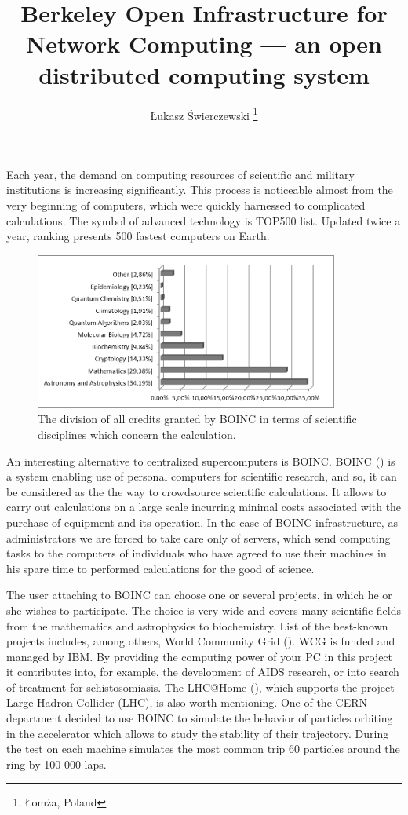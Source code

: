 \documentclass[10pt, a5paper]{article}
\begin{document}
\title{Berkeley Open Infrastructure for Network Computing — an open distributed computing system}
\author{Łukasz Świerczewski \footnote{Łomża, Poland}}
\maketitle
Each year, the demand on computing resources of scientific and military institutions is increasing significantly. This process is noticeable almost from the very beginning of computers, which were quickly harnessed to complicated calculations. The symbol of advanced technology is TOP500 list. Updated twice a year, ranking presents 500 fastest computers on Earth.

\begin{figure}[b!]
  \centering
  \includegraphics[width=10cm]{104_2013_w_Swierczewski_boinc_1}
  \caption{The division of all credits granted by BOINC in terms of scientific disciplines which concern the calculation.}\label{fig:swier1}
\end{figure}

An interesting alternative to centralized supercomputers is BOINC. BOINC (\cite{swier1}) is a system enabling use of personal computers for scientific research, and so, it can be considered as the the way to crowdsource scientific calculations. It allows to carry out calculations on a large scale incurring minimal costs associated with the purchase of equipment and its operation. In the case of BOINC infrastructure, as administrators we are forced to take care only of servers, which send computing tasks to the computers of individuals who have agreed to use their machines in his spare time to performed calculations for the good of science.

The user attaching to BOINC can choose one or several projects, in which he or she wishes to participate. The choice is very wide and covers many scientific fields from the mathematics and astrophysics to biochemistry. List of the best-known projects includes, among others, World Community Grid (\cite{swier2}). WCG is funded and managed by IBM. By providing the computing power of your PC in this project it contributes into, for example, the development of AIDS research, or into search of treatment for schistosomiasis. The LHC@Home (\cite{swier3}), which supports the project Large Hadron Collider (LHC), is also worth mentioning. One of the CERN department  decided to use BOINC to simulate the behavior of particles orbiting in the accelerator which allows to study the stability of their trajectory. During the test on each machine simulates the most common trip 60 particles around the ring by 100 000 laps.
\end{document}
